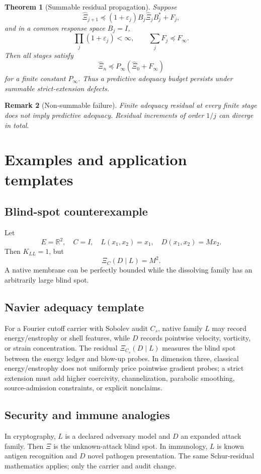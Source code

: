 \documentclass[11pt]{article}
\newtheorem{theorem}{Theorem}[section]
\newtheorem{remark}[theorem]{Remark}
\begin{document}
\begin{theorem}[Summable residual propagation]
Suppose
\[
\widehat\Xi_{j+1}\preceq (1+\varepsilon_j)B_j\widehat\Xi_jB_j^*+F_j,
\]
and in a common response space \(B_j=I\),
\[
\prod_j(1+\varepsilon_j)<\infty,
\qquad
\sum_jF_j\preceq F_\infty.
\]
Then all stages satisfy
\[
\widehat\Xi_n\preceq P_\infty(\widehat\Xi_0+F_\infty)
\]
for a finite constant \(P_\infty\).  Thus a predictive adequacy budget persists
under summable strict-extension defects.
\end{theorem}

\begin{remark}[Non-summable failure]
Finite adequacy residual at every finite stage does not imply predictive
adequacy.  Residual increments of order \(1/j\) can diverge in total.
\end{remark}

\section{Examples and application templates}
\subsection{Blind-spot counterexample}
Let
\[
E=\mathbb R^2,
\quad C=I,
\quad L(x_1,x_2)=x_1,
\quad D(x_1,x_2)=Mx_2.
\]
Then \(K_{LL}=1\), but
\[
\Xi_C(D\mid L)=M^2.
\]
A native membrane can be perfectly bounded while the dissolving family has an
arbitrarily large blind spot.

\subsection{Navier adequacy template}
For a Fourier cutoff carrier with Sobolev audit \(C_s\), native family \(L\) may
record energy/enstrophy or shell features, while \(D\) records pointwise velocity,
vorticity, or strain concentration.  The residual \(\Xi_{C_s}(D\mid L)\) measures
the blind spot between the energy ledger and blow-up probes.  In dimension three,
classical energy/enstrophy does not uniformly price pointwise gradient probes; a
strict extension must add higher coercivity, channelization, parabolic smoothing,
source-admission constraints, or explicit nonclaims.

\subsection{Security and immune analogies}
In cryptography, \(L\) is a declared adversary model and \(D\) an expanded attack
family.  Then \(\Xi\) is the unknown-attack blind spot.  In immunology, \(L\) is
known antigen recognition and \(D\) novel pathogen presentation.  The same
Schur-residual mathematics applies; only the carrier and audit change.
\end{document}
